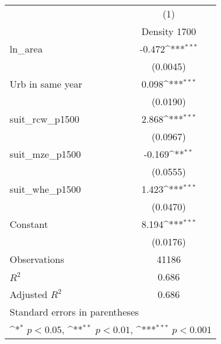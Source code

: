 {
\def\sym#1{\ifmmode^{#1}\else\(^{#1}\)\fi}
\begin{tabular}{l*{1}{c}}
\toprule
                    &\multicolumn{1}{c}{(1)}\\
                    &\multicolumn{1}{c}{Density 1700}\\
\midrule
ln\_area             &      -0.472\sym{***}\\
                    &    (0.0045)         \\
\addlinespace
Urb in same year    &       0.098\sym{***}\\
                    &    (0.0190)         \\
\addlinespace
suit\_rcw\_p1500      &       2.868\sym{***}\\
                    &    (0.0967)         \\
\addlinespace
suit\_mze\_p1500      &      -0.169\sym{**} \\
                    &    (0.0555)         \\
\addlinespace
suit\_whe\_p1500      &       1.423\sym{***}\\
                    &    (0.0470)         \\
\addlinespace
Constant            &       8.194\sym{***}\\
                    &    (0.0176)         \\
\midrule
Observations        &       41186         \\
\(R^{2}\)           &       0.686         \\
Adjusted \(R^{2}\)  &       0.686         \\
\bottomrule
\multicolumn{2}{l}{\footnotesize Standard errors in parentheses}\\
\multicolumn{2}{l}{\footnotesize \sym{*} \(p<0.05\), \sym{**} \(p<0.01\), \sym{***} \(p<0.001\)}\\
\end{tabular}
}
